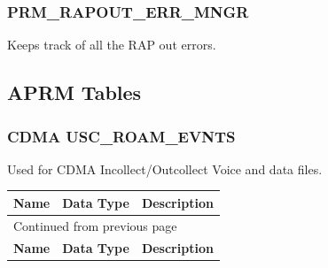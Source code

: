 \documentclass[12pt,twoside]{article}
\begin{document}
\normalsize
\subsubsection{PRM\_RAPOUT\_ERR\_MNGR}
\label{sec:orgheadline135}
Keeps track of all the RAP out errors.
\subsection{APRM Tables}
\label{sec:orgheadline142}
\subsubsection{CDMA USC\_ROAM\_EVNTS}
\label{sec:orgheadline137}
Used for CDMA Incollect/Outcollect Voice and data files.
\footnotesize

\begin{longtable}{l|l|l}
\hline
\textbf{Name} & \textbf{Data Type} & \textbf{Description}\\
\hline
\endfirsthead
\multicolumn{3}{l}{Continued from previous page} \\
\hline

\textbf{Name} & \textbf{Data Type} & \textbf{Description} \\


\end{longtable}
\end{document}
